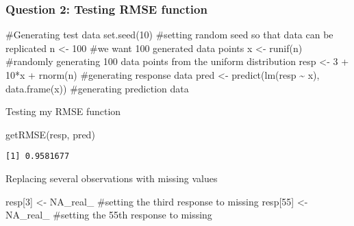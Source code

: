 \documentclass[
  letterpaper,
  DIV=11,
  numbers=noendperiod]{scrartcl}
\newenvironment{Shaded}{\begin{snugshade}}{\end{snugshade}}
\newcommand{\CommentTok}[1]{\textcolor[rgb]{0.37,0.37,0.37}{#1}}
\newcommand{\ConstantTok}[1]{\textcolor[rgb]{0.56,0.35,0.01}{#1}}
\newcommand{\DecValTok}[1]{\textcolor[rgb]{0.68,0.00,0.00}{#1}}
\newcommand{\FunctionTok}[1]{\textcolor[rgb]{0.28,0.35,0.67}{#1}}
\newcommand{\NormalTok}[1]{\textcolor[rgb]{0.00,0.23,0.31}{#1}}
\newcommand{\OtherTok}[1]{\textcolor[rgb]{0.00,0.23,0.31}{#1}}
\newcommand{\SpecialCharTok}[1]{\textcolor[rgb]{0.37,0.37,0.37}{#1}}
\begin{document}
\subsubsection{Question 2: Testing RMSE
function}\label{question-2-testing-rmse-function}

\begin{Shaded}
\begin{Highlighting}[]
\CommentTok{\#Generating test data}
\FunctionTok{set.seed}\NormalTok{(}\DecValTok{10}\NormalTok{) }\CommentTok{\#setting random seed so that data can be replicated}
\NormalTok{n }\OtherTok{\textless{}{-}} \DecValTok{100} \CommentTok{\#we want 100 generated data points}
\NormalTok{x }\OtherTok{\textless{}{-}} \FunctionTok{runif}\NormalTok{(n) }\CommentTok{\#randomly generating 100 data points from the uniform distribution}
\NormalTok{resp }\OtherTok{\textless{}{-}} \DecValTok{3} \SpecialCharTok{+} \DecValTok{10}\SpecialCharTok{*}\NormalTok{x }\SpecialCharTok{+} \FunctionTok{rnorm}\NormalTok{(n) }\CommentTok{\#generating response data}
\NormalTok{pred }\OtherTok{\textless{}{-}} \FunctionTok{predict}\NormalTok{(}\FunctionTok{lm}\NormalTok{(resp }\SpecialCharTok{\textasciitilde{}}\NormalTok{ x), }\FunctionTok{data.frame}\NormalTok{(x)) }\CommentTok{\#generating prediction data}
\end{Highlighting}
\end{Shaded}

Testing my RMSE function

\begin{Shaded}
\begin{Highlighting}[]
\FunctionTok{getRMSE}\NormalTok{(resp, pred)}
\end{Highlighting}
\end{Shaded}

\begin{verbatim}
[1] 0.9581677
\end{verbatim}

Replacing several observations with missing values

\begin{Shaded}
\begin{Highlighting}[]
\NormalTok{resp[}\DecValTok{3}\NormalTok{] }\OtherTok{\textless{}{-}} \ConstantTok{NA\_real\_} \CommentTok{\#setting the third response to missing}
\NormalTok{resp[}\DecValTok{55}\NormalTok{] }\OtherTok{\textless{}{-}} \ConstantTok{NA\_real\_} \CommentTok{\#setting the 55th response to missing}
\end{Highlighting}
\end{Shaded}
\end{document}
